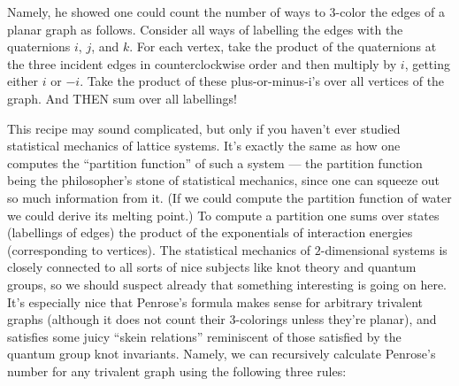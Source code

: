 \documentclass[12pt]{article}
\begin{document}
Namely, he showed one could count the number of ways to 3-color the
edges of a planar graph as follows. Consider all ways of labelling the
edges with the quaternions \(i\), \(j\), and \(k\). For each vertex,
take the product of the quaternions at the three incident edges in
counterclockwise order and then multiply by \(i\), getting either \(i\)
or \(-i\). Take the product of these plus-or-minus-i's over all vertices
of the graph. And THEN sum over all labellings!

This recipe may sound complicated, but only if you haven't ever studied
statistical mechanics of lattice systems. It's exactly the same as how
one computes the ``partition function'' of such a system --- the
partition function being the philosopher's stone of statistical
mechanics, since one can squeeze out so much information from it. (If we
could compute the partition function of water we could derive its
melting point.) To compute a partition one sums over states (labellings
of edges) the product of the exponentials of interaction energies
(corresponding to vertices). The statistical mechanics of
\(2\)-dimensional systems is closely connected to all sorts of nice
subjects like knot theory and quantum groups, so we should suspect
already that something interesting is going on here. It's especially
nice that Penrose's formula makes sense for arbitrary trivalent graphs
(although it does not count their 3-colorings unless they're planar),
and satisfies some juicy ``skein relations'' reminiscent of those
satisfied by the quantum group knot invariants. Namely, we can
recursively calculate Penrose's number for any trivalent graph using the
following three rules:
\end{document}
